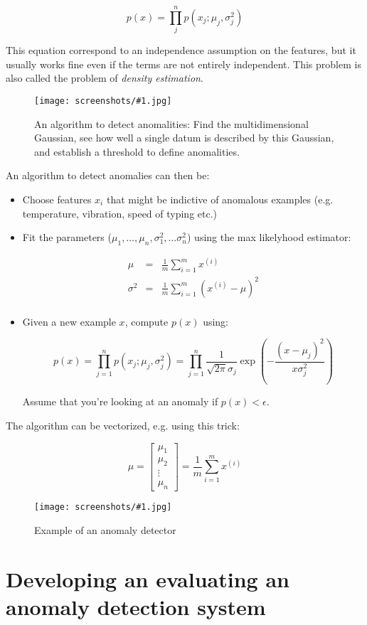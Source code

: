 \documentclass[a4, 12pt, english, USenglish]{scrreprt}
\newcommand{\screenshot}[2]{
\begin{figure}[htb]
\texttt{[image: screenshots/\#1.jpg]}
\label{#1}
\caption{#2}
\end{figure}}
\newcommand{\brackets}[1]{\ensuremath{\left[{#1}\right]}}
\newcommand{\parens}[1]{\ensuremath{\left({#1}\right)}}
\newcommand{\idx}[1]{{\em #1}\index{#1}}
\begin{document}
\[
   p(x) = \prod_j^n p(x_j;\mu_j,\sigma_j^2)
\]

This equation correspond to an independence assumption on the
features, but it usually works fine even if the terms are not entirely
independent.  This problem is also called the problem of \idx{density
  estimation}.

\screenshot{anomalydetectionalgorithm}{An algorithm to detect
  anomalities: Find the multidimensional Gaussian, see how well a
  single datum is described by this Gaussian, and establish a
  threshold to define anomalities.}

An algorithm to detect anomalies can then be:

\begin{itemize}
\item Choose features \(x_i\) that might be indictive of anomalous
  examples (e.g. temperature, vibration, speed of typing etc.)

\item Fit the parameters (\(\mu_1, \ldots, \mu_n, \sigma_1^2, \ldots
  \sigma_n^2\)) using the max likelyhood estimator:

\[
\begin{array}{lcl}
\mu         &=& \frac{1}{m} \sum_{i=1}^{m}x^{(i)} \\
\sigma^2 &=& \frac{1}{m} \sum_{i=1}^{m}\parens{x^{(i)} - \mu}^2 \\
\end{array}
\]

\item Given a new example \(x\), compute \(p(x)\) using:

\[
p(x) = \prod_{j=1}^n p(x_j; \mu_j, \sigma_j^2)=\prod_{j=1}^n\frac{1}{\sqrt{2\pi}\sigma_j}\exp{\parens{-\frac{(x-\mu_j)^2}{x\sigma_j^2}}}     
\]

Assume that you're looking at an anomaly if \(p(x)<\epsilon\).
\end{itemize}


The algorithm can be vectorized, e.g. using this trick:

\[
 \mu = \brackets{
\begin{array}{c}
\mu_1\\\mu_2\\\vdots\\\mu_n
\end{array}} =
\frac{1}{m}\sum_{i=1}^m x^{(i)}
\]

\screenshot{anomalyexample}{Example of an anomaly detector}

\section{Developing an evaluating an anomaly detection system}
\end{document}
